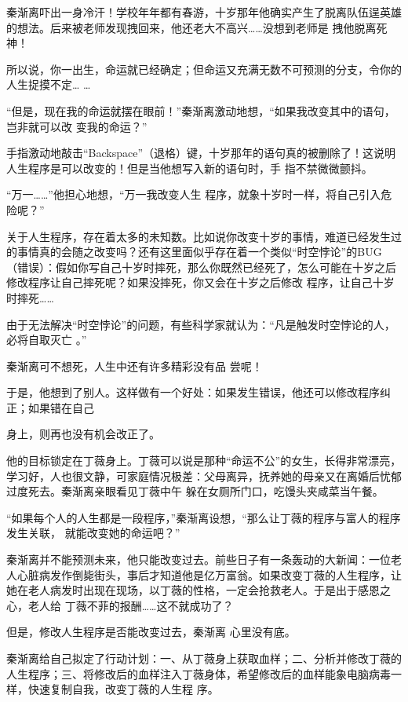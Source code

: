 \documentclass{article}
\begin{document}
秦渐离吓出一身冷汗！学校年年都有春游，十岁那年他确实产生了脱离队伍逞英雄的想法。后来被老师发现拽回来，他还老大不高兴……没想到老师是
拽他脱离死神！ 

所以说，你一出生，命运就已经确定；但命运又充满无数不可预测的分支，令你的人生捉摸不定…
… 

“但是，现在我的命运就摆在眼前！”秦渐离激动地想，“如果我改变其中的语句，岂非就可以改
变我的命运？” 

手指激动地敲击“Backspace”（退格）键，十岁那年的语句真的被删除了！这说明人生程序是可以改变的！但是当他想写入新的语句时，手
指不禁微微颤抖。 

\newpage

“万一……”他担心地想，“万一我改变人生
程序，就象十岁时一样，将自己引入危险呢？” 

关于人生程序，存在着太多的未知数。比如说你改变十岁的事情，难道已经发生过的事情真的会随之改变吗？还有这里面似乎存在着一个类似“时空悖论”的BUG（错误）：假如你写自己十岁时摔死，那么你既然已经死了，怎么可能在十岁之后修改程序让自己摔死呢？如果没摔死，你又会在十岁之后修改
程序，让自己十岁时摔死…… 

由于无法解决“时空悖论”的问题，有些科学家就认为：“凡是触发时空悖论的人，必将自取灭亡
。” 

秦渐离可不想死，人生中还有许多精彩没有品
尝呢！ 

于是，他想到了别人。这样做有一个好处：如果发生错误，他还可以修改程序纠正；如果错在自己

\newpage
身上，则再也没有机会改正了。 

他的目标锁定在丁薇身上。丁薇可以说是那种“命运不公”的女生，长得非常漂亮，学习好，人也很文静，可家庭情况极差：父母离异，抚养她的母亲又在离婚后忧郁过度死去。秦渐离亲眼看见丁薇中午
躲在女厕所门口，吃馒头夹咸菜当午餐。 

“如果每个人的人生都是一段程序，”秦渐离设想，“那么让丁薇的程序与富人的程序发生关联，
就能改变她的命运吧？” 

秦渐离并不能预测未来，他只能改变过去。前些日子有一条轰动的大新闻：一位老人心脏病发作倒毙街头，事后才知道他是亿万富翁。如果改变丁薇的人生程序，让她在老人病发时出现在现场，以丁薇的性格，一定会抢救老人。于是出于感恩之心，老人给
丁薇不菲的报酬……这不就成功了？ 

但是，修改人生程序是否能改变过去，秦渐离
心里没有底。 

\newpage

秦渐离给自己拟定了行动计划：一、从丁薇身上获取血样；二、分析并修改丁薇的人生程序；三、将修改后的血样注入丁薇身体，希望修改后的血样能象电脑病毒一样，快速复制自我，改变丁薇的人生程
序。 
\end{document}
